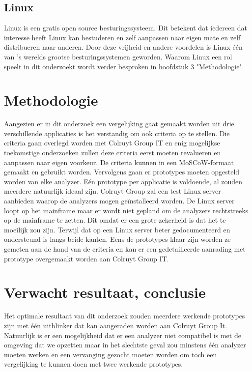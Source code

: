 \subsection{Linux}
Linux is een gratis open source besturingssysteem. Dit betekent dat iedereen dat interesse heeft Linux kan bestuderen en zelf aanpassen naar eigen mate en zelf distribueren naar anderen. Door deze vrijheid en andere voordelen is Linux één van 's werelds grootse besturingssystemen geworden. Waarom Linux een rol speelt in dit onderzoekt wordt verder besproken in hoofdstuk 3 "Methodologie". \autocite{RedHat2023}
\section{Methodologie}%
\label{sec:methodologie}
Aangezien er in dit onderzoek een vergelijking gaat gemaakt worden uit drie verschillende applicaties is het verstandig om ook criteria op te stellen. Die criteria gaan overlegd worden met Colruyt Group IT en enig mogelijkse toekomstige onderzoeken zullen deze criteria eerst moeten revalueren en aanpassen naar eigen voorkeur. De criteria kunnen in een MoSCoW-formaat gemaakt en gebruikt worden. Vervolgens gaan er prototypes moeten opgesteld worden van elke analyzer. Eén prototype per applicatie is voldoende, al zouden meerdere natuurlijk ideaal zijn. Colruyt Group zal een test Linux server aanbieden waarop de analyzers mogen geïnstalleerd worden. De Linux server loopt op het mainframe maar er wordt niet gepland om de analyzers rechtstreeks op de mainframe te zetten. Dit omdat er een grote zekerheid is dat het te moeilijk zou zijn. Terwijl dat op een Linux server beter gedocumenteerd en ondersteund is langs beide kanten. Eens de prototypes klaar zijn worden ze gemeten aan de hand van de criteria en kan er een gedetailleerde aanrading met prototype overgemaakt worden aan Colruyt Group IT.


\section{Verwacht resultaat, conclusie}%
\label{sec:verwachte_resultaten}
Het optimale resultaat van dit onderzoek zouden meerdere werkende prototypes zijn met één uitblinker dat kan aangeraden worden aan Colruyt Group It. Natuurlijk is er een mogelijkheid dat er een analyzer niet compatibel is met de omgeving dat we opzetten maar in het slechtste geval zou minstens één analyzer moeten werken en een vervanging gezocht moeten worden om toch een vergelijking te kunnen doen met twee werkende prototypes.


